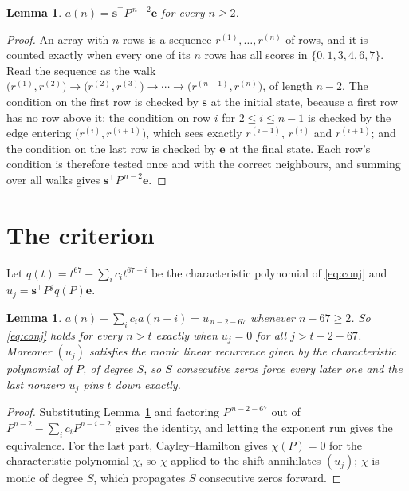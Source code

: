 \documentclass[11pt,a4paper]{article}
\theoremstyle{plain}
\newtheorem{lemma}[theorem]{Lemma}
\theoremstyle{definition}
\begin{document}
\begin{lemma}\label{lem:walk}
$a(n)=\mathbf{s}^{\!\top}P^{\,n-2}\mathbf{e}$ for every $n\ge2$.
\end{lemma}

\begin{proof}
An array with $n$ rows is a sequence $r^{(1)},\dots,r^{(n)}$ of rows, and it is counted
exactly when every one of its $n$ rows has all scores in $\{0,1,3,4,6,7\}$. Read the sequence as the
walk $\bigl(r^{(1)},r^{(2)}\bigr)\to\bigl(r^{(2)},r^{(3)}\bigr)\to\cdots\to
\bigl(r^{(n-1)},r^{(n)}\bigr)$, of length $n-2$. The condition on the first row is
checked by $\mathbf{s}$ at the initial state, because a first row has no row above it; the
condition on row $i$ for $2\le i\le n-1$ is checked by the edge entering
$\bigl(r^{(i)},r^{(i+1)}\bigr)$, which sees exactly $r^{(i-1)}$, $r^{(i)}$ and
$r^{(i+1)}$; and the condition on the last row is checked by $\mathbf{e}$ at the final
state. Each row's condition is therefore tested once and with the correct neighbours, and
summing over all walks gives $\mathbf{s}^{\!\top}P^{\,n-2}\mathbf{e}$.
\end{proof}

\section{The criterion}

Let $q(t)=t^{67}-\sum_i c_i t^{67-i}$ be the characteristic polynomial of
\eqref{eq:conj} and $u_j=\mathbf{s}^{\!\top}P^{j}q(P)\mathbf{e}$.

\begin{lemma}\label{lem:crit}
$a(n)-\sum_i c_i a(n-i)=u_{\,n-2-67}$ whenever $n-67\ge2$. So \eqref{eq:conj}
holds for every $n>t$ exactly when $u_j=0$ for all $j>t-2-67$. Moreover $(u_j)$
satisfies the monic linear recurrence given by the characteristic polynomial of $P$, of
degree $S$, so $S$ consecutive zeros force every later one and the last nonzero $u_j$ pins
$t$ down exactly.
\end{lemma}

\begin{proof}
Substituting Lemma~\ref{lem:walk} and factoring $P^{\,n-2-67}$ out of
$P^{n-2}-\sum_i c_i P^{n-i-2}$ gives the identity, and letting the exponent run gives the
equivalence. For the last part, Cayley--Hamilton gives $\chi(P)=0$ for the characteristic
polynomial $\chi$, so $\chi$ applied to the shift annihilates $(u_j)$; $\chi$ is monic of
degree $S$, which propagates $S$ consecutive zeros forward.
\end{proof}
\end{document}
